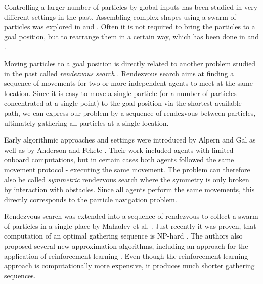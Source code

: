 Controlling a larger number of particles by global inputs has been studied in very different settings in the past. Assembling complex shapes using a swarm of particles was explored in \cite{becker2018tilt} and \cite{balanza2019full}. Often it is not required to bring the particles to a goal position, but to rearrange them in a certain way, which has been done in \cite{becker2013massive} and \cite{zhang2017rearranging}. 

Moving particles to a goal position is directly related to another problem studied in the past called \textit{rendezvous search} \cite{alpern2006theory}. Rendezvous search aims at finding a sequence of movements for two or more independent agents to meet at the same location. Since it is easy to move a single particle (or a number of particles concentrated at a single point) to the goal position via the shortest available path, we can express our problem by a sequence of rendezvous between particles, ultimately gathering all particles at a single location.

 Early algorithmic approaches and settings were introduced by Alpern and Gal \cite{alpern2006theory} as well as by Anderson and Fekete \cite{anderson2001two}. Their work included agents with limited onboard computations, but in certain cases both agents followed the same movement protocol - executing the same movement. The problem can therefore also be called \textit{symmetric} rendezvous search where the symmetry is only broken by interaction with obstacles. Since all agents perform the same movements, this directly corresponds to the particle navigation problem. 

Rendezvous search was extended into a sequence of rendezvous to collect a swarm of particles in a single place by Mahadev et al. \cite{mahadev2016collecting}. Just recently it was proven, that computation of an optimal gathering sequence is NP-hard \cite{becker2020}. The authors also proposed several new approximation algorithms, including an approach for the application of reinforcement learning \cite{huang2019, becker2020}. Even though the reinforcement learning approach is computationally more expensive, it produces much shorter gathering sequences.

